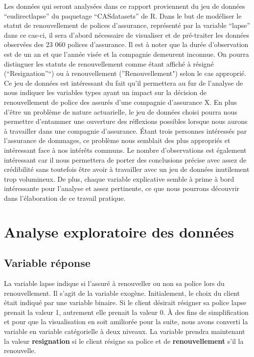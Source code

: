 \documentclass[
]{article}
\begin{document}
Les données qui seront analysées dans ce rapport proviennent du jeu de
données ``eudirectlapse'' du paquetage ``CASdatasets'' de R. Dans le but
de modéliser le statut de renouvellement de polices d'assurance,
représenté par la variable ``lapse'' dans ce cas-ci, il sera d'abord
nécessaire de visualiser et de pré-traiter les données observées des 23
060 polices d'assurance. Il est à noter que la durée d'observation est
de un an et que l'année visée et la compagnie demeurent inconnue. On
pourra distinguer les statuts de renouvellement comme étant affiché à
résigné (``Resignation''``) ou à renouvellement (''Renouvellement")
selon le cas approprié. Ce jeu de données est intéressant du fait qu'il
permettera au fur de l'analyse de nous indiquer les variables types
ayant un impact sur la décision de renouvellement de police des assurés
d'une compagnie d'assurance X. En plus d'être un problème de nature
actuarielle, le jeu de données choisi pourra nous permettre d'entammer
une ouverture des réflexions possibles lorsque nous aurons à travailler
dans une compagnie d'assurance. Étant trois personnes intéressés par
l'assurance de dommages, ce problème nous semblait des plus appropriés
et intéressant face à nos intérêts communs. Le nombre d'observations est
également intéressant car il nous permettera de porter des conclusions
précise avec assez de crédibilité sans toutefois être avoir à travailler
avec un jeu de données inutilement trop volumineux. De plus, chaque
variable explicative semble à prime à bord intéressante pour l'analyse
et assez pertinente, ce que nous pourrons découvrir dans l'élaboration
de ce travail pratique.

\newpage

\hypertarget{analyse-exploratoire-des-donnuxe9es}{%
\section{Analyse exploratoire des
données}\label{analyse-exploratoire-des-donnuxe9es}}

\hypertarget{variable-ruxe9ponse}{%
\subsection{Variable réponse}\label{variable-ruxe9ponse}}

La variable lapse indique si l'assuré à renouveller ou non sa police
lors du renouvellement. Il s'agit de la variable exogène. Initialement,
le choix du client était indiqué par une variable binaire. Si le client
désirait résigner sa police lapse prenait la valeur 1, autrement elle
prenait la valeur 0. À des fins de simplification et pour que la
visualisation en soit amiliorée pour la suite, nous avons converti la
variable en variable catégorielle à deux niveaux. La variable prendra
maintenant la valeur \textbf{resignation} si le client résigne sa police
et de \textbf{renouvellement} s'il la renouvelle.
\end{document}
